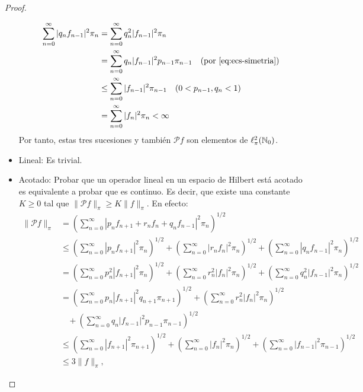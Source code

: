 \begin{proof}
\begin{itemize}
\begin{equation*}
\begin{split}
                    \sum_{n=0}^\infty |q_n f_{n-1}|^2 \pi_n &= \sum_{n=0}^\infty q_n^2 |f_{n-1}|^2 \pi_n \\
                    &= \sum_{n=0}^\infty q_n |f_{n-1}|^2 p_{n-1}\pi_{n-1} \ \ \ \text{(por \eqref{eq:ecs-simetria})} \\
                    &\leq  \sum_{n=0}^\infty  |f_{n-1}|^2\pi_{n-1} \ \ \ (0<p_{n-1},q_{n} <1) \\
                    &= \sum_{n=0}^\infty |f_n|^2 \pi_n  < \infty
                \end{split}
            \end{equation*}
            Por tanto, estas tres sucesiones y también $\mathcal P f$ son elementos de $\ell^2_\pi(\mathbb{N}_0)$.

            \item Lineal: Es trivial.
            \item Acotado: Probar que un operador lineal en un espacio de Hilbert está acotado es equivalente a probar que es continuo. Es decir, que existe una constante $K\geq 0$ tal que $\|\mathcal P f\|_\pi\geq K\|f\|_\pi$. En efecto:
            \begin{equation*}
                \begin{split}
                    \|\mathcal P f\|_\pi &= \left(\sum_{n=0}^\infty |p_n f_{n+1} + r_n f_n + q_n f_{n-1}|^2 \pi_n\right)^{1/2} \\
                    &\leq \left(\sum_{n=0}^\infty |p_n f_{n+1}|^2\pi_n\right)^{1/2} + \left(\sum_{n=0}^\infty |r_n f_{n}|^2\pi_n\right)^{1/2} + \left(\sum_{n=0}^\infty |q_n f_{n-1}|^2\pi_n\right)^{1/2}  \\
                    &= \left(\sum_{n=0}^\infty p_n^2 |f_{n+1}|^2\pi_n\right)^{1/2} + \left(\sum_{n=0}^\infty r_n^2 |f_{n}|^2\pi_n\right)^{1/2} + \left(\sum_{n=0}^\infty q_n^2 |f_{n-1}|^2\pi_n\right)^{1/2}  \\
                    &= \left(\sum_{n=0}^\infty p_n |f_{n+1}|^2q_{n+1}\pi_{n+1}\right)^{1/2} + \left(\sum_{n=0}^\infty r_n^2 |f_{n}|^2\pi_n\right)^{1/2} \\ &\ \ \ \ + \left(\sum_{n=0}^\infty q_n |f_{n-1}|^2p_{n-1}\pi_{n-1}\right)^{1/2} \\
                    &\leq \left(\sum_{n=0}^\infty |f_{n+1}|^2\pi_{n+1}\right)^{1/2} + \left(\sum_{n=0}^\infty |f_{n}|^2\pi_n\right)^{1/2} + \left(\sum_{n=0}^\infty |f_{n-1}|^2\pi_{n-1}\right)^{1/2} \\
                    &\leq 3  \|f\|_\pi,
                \end{split}

\end{equation*}
\end{itemize}
\end{proof}
